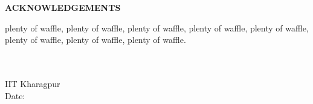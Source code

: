 \thispagestyle{plain}

\begin{center}
 \Large {\bf \uppercase{Acknowledgements}}
\end{center}

\vspace{3\baselineskip}

\noindent
plenty of waffle, plenty of waffle, plenty of waffle, plenty of waffle, plenty of waffle, plenty of waffle, plenty of waffle, plenty of waffle.

\noindent
\vspace{\baselineskip} \\
\textbf{\myname} \\
IIT Kharagpur \\
Date: